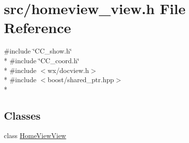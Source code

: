 \hypertarget{a00233}{\section{src/homeview\-\_\-view.h File Reference}
\label{a00233}
}
{\ttfamily \#include \char`\"{}C\-C\-\_\-show.\-h\char`\"{}}\\*
{\ttfamily \#include \char`\"{}C\-C\-\_\-coord.\-h\char`\"{}}\\*
{\ttfamily \#include $<$wx/docview.\-h$>$}\\*
{\ttfamily \#include $<$boost/shared\-\_\-ptr.\-hpp$>$}\\*
\subsection*{Classes}
\begin{DoxyCompactItemize}
\item 
class \hyperlink{a00108}{Home\-View\-View}
\end{DoxyCompactItemize}
